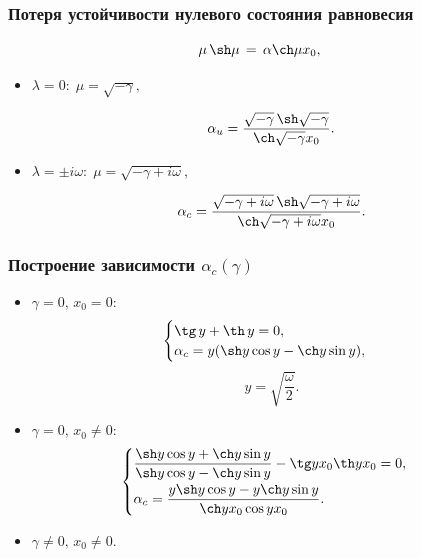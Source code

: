 \documentclass[fullscreen=true, unicode, bookmarks=false]{beamer}
\begin{document}
\begin{frame}
\frametitle{ Потеря устойчивости нулевого состояния равновесия }
 
\begin{equation}
	\mu \, \sh \mu \, = \, \alpha \ch \mu x_0,
\end{equation}

\medskip
\pause

\begin{itemize}

\item { $ \lambda = 0: \; \mu = \sqrt{-\gamma}, $ 
}

$$ \alpha_u = \frac{ \sqrt{-\gamma} \, \sh \sqrt{-\gamma} }{ \ch \sqrt{-\gamma} x_0 }. $$

\pause
\item { $ \lambda = \pm i \omega: \; \mu = \sqrt{-\gamma + i \omega}, $ 
}

$$ \alpha_c = \frac{ \sqrt{-\gamma + i \omega} \, \sh \sqrt{-\gamma + i \omega} }{ \ch \sqrt{-\gamma + i \omega} x_0 }. $$

\end{itemize}	

\end{frame}

\begin{frame}
\frametitle{ Построение зависимости $ \alpha_c(\gamma) $ }
 
\begin{itemize}

\item { $ \gamma = 0, \, x_0 = 0: $ 
\begin{equation}
 \begin{cases}
   \tg \, y + \th \, y = 0, 
   \\
   \alpha_c = y(\sh y \cos y - \ch y \sin y),
 \end{cases}
\end{equation}
$$ y = \sqrt{ \frac{\omega}{2} }. $$
}

\pause

\item { $ \gamma = 0, \, x_0 \neq 0: $ 
\begin{equation}
 \begin{cases}
   \dfrac{\sh y \cos y + \ch y \sin y}{\sh y \cos y - \ch y \sin y} - \tg y x_0 \th y x_0 = 0, 
   \vspace{0.1cm}
   \\ 
   \alpha_c = \dfrac{y \sh y \cos y - y \ch y \sin y}{\ch y x_0 \cos y x_0}.
 \end{cases}
\end{equation}
}

\pause

\item { $ \gamma \neq 0, \, x_0 \neq 0. $ 
}

\end{itemize}	

\end{frame}
\end{document}
